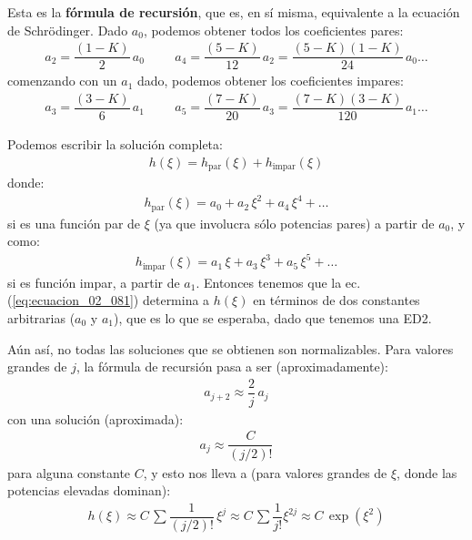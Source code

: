 Esta es la \textbf{fórmula de recursión}, que es, en sí misma, equivalente a la ecuación de Schrödinger. Dado $a_{0}$, podemos obtener todos los coeficientes pares:
\begin{align*}
a_{2} = \dfrac{(1 - K)}{2} \, a_{0} \hspace{1cm} a_{4} = \dfrac{(5 - K)}{12} \, a_{2} = \dfrac{(5 - K)(1 - K)}{24} \, a_{0} \ldots
\end{align*}
comenzando con un $a_{1}$ dado, podemos obtener los coeficientes impares:
\begin{align*}
a_{3} = \dfrac{(3 - K)}{6} \, a_{1} \hspace{1cm} a_{5} = \dfrac{(7 - K)}{20} \, a_{3} = \dfrac{(7 - K)(3 - K)}{120} \, a_{1} \ldots
\end{align*}
\par
Podemos escribir la solución completa:
\begin{align}
h (\xi) = h_{\text{par}} (\xi) + h_{\text{impar}} (\xi)
\label{eq:ecuacion_02_082}
\end{align}
donde:
\begin{align*}
h_{\text{par}} (\xi) = a_{0} + a_{2} \, \xi^{2} + a_{4} \, \xi^{4} + \ldots
\end{align*}
si es una función par de $\xi$ (ya que involucra sólo potencias pares) a partir de $a_{0}$, y como:
\begin{align*}
h_{\text{impar}} (\xi) = a_{1} \, \xi + a_{3} \, \xi^{3} + a_{5} \, \xi^{5} + \ldots
\end{align*}
si es función impar, a partir de $a_{1}$. Entonces tenemos que la ec. (\ref{eq:ecuacion_02_081}) determina a $h(\xi)$ en términos de dos constantes arbitrarias ($a_{0}$ y $a_{1}$), que es lo que se esperaba, dado que tenemos una ED2.
\par
Aún así, no todas las soluciones que se obtienen son normalizables. Para valores grandes de $j$, la fórmula de recursión pasa a ser (aproximadamente):
\begin{align*}
a_{j+2} \approx \dfrac{2}{j} \, a_{j}
\end{align*}
con una solución (aproximada):
\begin{align*}
a_{j} \approx \dfrac{C}{(j/2)!}
\end{align*}
para alguna constante $C$, y esto nos lleva a (para valores grandes de $\xi$, donde las potencias elevadas dominan):
\begin{align*}
h (\xi) \approx C \, \sum \dfrac{1}{(j/2)!} \, \xi^{j} \approx C \, \sum \dfrac{1}{j!} \xi^{2 j} \approx C \, \exp \left( \xi^{2} \right)
\end{align*}
